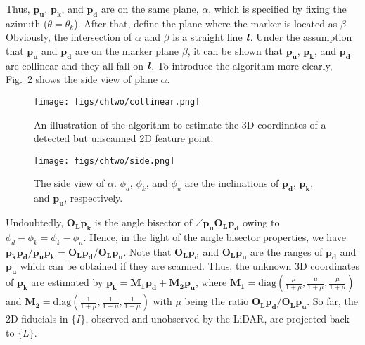 %
Thus, $\mathbf{{p}_{u}}$, $\mathbf{{p}_{k}}$, and $\mathbf{{p}_{d}}$ are on the same plane, $\alpha$, which is specified by fixing the azimuth ($\theta=\theta_{k}$). 
%
After that, define the plane where the marker is located as $\beta$. Obviously, the intersection of $\alpha$ and $\beta$ is a straight line $\textbf{\textit{l}}$. Under the assumption that $\mathbf{{p}_{u}}$ and $\mathbf{{p}_{d}}$  are on the marker plane $\beta$, it can be shown that  $\mathbf{{p}_{u}}$, $\mathbf{{p}_{k}}$, and $\mathbf{{p}_{d}}$ are collinear and they all fall on $\textbf{\textit{l}}$. To introduce the algorithm more clearly, Fig.~\ref{side} shows the side view of plane $\alpha$.

\begin{figure}[H] 
	\centering
	\texttt{[image: figs/chtwo/collinear.png]}
	\caption{An illustration of the algorithm to estimate the 3D coordinates of a detected but unscanned 2D feature point.} \label{collinear}
\end{figure} \par

\begin{figure}[H] 
	\centering
	\texttt{[image: figs/chtwo/side.png]}
	\caption{The side view of $\alpha$. $\phi_{d}$, $\phi_{k}$, and $\phi_{u}$ are the inclinations of $\mathbf{{p}_{d}}$, $\mathbf{{p}_{k}}$, and $\mathbf{{p}_{u}}$, respectively. }
	\label{side}
\end{figure}
Undoubtedly, $\mathbf{{O}_{L}}\mathbf{{p}_{k}}$ is the angle bisector of $\angle\mathbf{{p}_{u}}\mathbf{{O}_{L}}\mathbf{{p}_{d}}$ owing to $\phi_{d}-\phi_{k}=\phi_{k}-\phi_{u}$. Hence, in the light of the angle bisector properties, we have 
	$\mathbf{{p}_{k}}\mathbf{{p}_{d}}/\mathbf{{p}_{u}}\mathbf{{p}_{k}}=\mathbf{{O}_{L}}\mathbf{{p}_{d}}/\mathbf{{O}_{L}}\mathbf{{p}_{u}}$. Note that $\mathbf{{O}_{L}}\mathbf{{p}_{d}}$ and $\mathbf{{O}_{L}}\mathbf{{p}_{u}}$ are the ranges of $\mathbf{{p}_{d}}$ and $\mathbf{{p}_{u}}$ which can be obtained if they are scanned. Thus, the unknown 3D coordinates of $\mathbf{{p}_{k}}$ are estimated by $\mathbf{{p}_{k}}=\mathbf{{M}_{1}}\mathbf{{p}_{d}}+\mathbf{{M}_{2}}\mathbf{{p}_{u}}$, where $\mathbf{{M}_{1}}=\mathrm{diag}(\frac{\mu}{1+\mu} ,\frac{\mu}{1+\mu} ,\frac{\mu}{1+\mu} ) $ and $\mathbf{{M}_{2}}=\mathrm{diag} ( \frac{1}{1+\mu}, \frac{1}{1+\mu}, \frac{1}{1+\mu})$ with $\mu$ being the ratio $\mathbf{{O}_{L}}\mathbf{{p}_{d}}/\mathbf{{O}_{L}}\mathbf{{p}_{u}}$. So far, the 2D fiducials in $\{I\}$, observed and unobserved by the LiDAR, are projected back to ${\{L\}}$.

